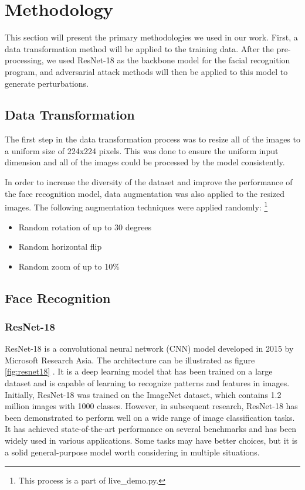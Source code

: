 \section{Methodology}

This section will present the primary methodologies we used in our work. First, a data transformation method will be applied to the training data. After the pre-processing, we used ResNet-18 as the backbone model for the facial recognition program, and adversarial attack methods will then be applied to this model to generate perturbations. 

\subsection{Data Transformation}

The first step in the data transformation process was to resize all of the images to a uniform size of 224x224 pixels. This was done to ensure the uniform input dimension and all of the images could be processed by the model consistently. 

In order to increase the diversity of the dataset and improve the performance of the face recognition model, data augmentation was also applied to the resized images. The following augmentation techniques were applied randomly:
\footnote{This process is a part of live\_demo.py.}

\begin{itemize}
    \item Random rotation of up to 30 degrees
    \item Random horizontal flip
    \item Random zoom of up to 10\%
\end{itemize}


\subsection{Face Recognition}

\subsubsection{ResNet-18}


ResNet-18 is a convolutional neural network (CNN) model developed in 2015 by Microsoft Research Asia. The architecture can be illustrated as figure \ref{fig:resnet18} \cite{ResNet-18}. It is a deep learning model that has been trained on a large dataset and is capable of learning to recognize patterns and features in images. Initially, ResNet-18 was trained on the ImageNet dataset, which contains 1.2 million images with 1000 classes. However, in subsequent research, ResNet-18 has been demonstrated to perform well on a wide range of image classification tasks. It has achieved state-of-the-art performance on several benchmarks and has been widely used in various applications. Some tasks may have better choices, but it is a solid general-purpose model worth considering in multiple situations.\\


